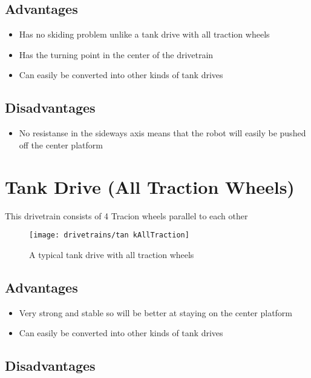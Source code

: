 \documentclass[../../main.tex]{subfiles}
\begin{document}
\subsection{Advantages} 

\begin{itemize} \item Has no skiding problem unlike a tank drive with all traction wheels \item Has the turning point in the center of the drivetrain \item Can easily be converted into other kinds of tank drives \end{itemize} 

\subsection{Disadvantages} 

\begin{itemize} \item No resistanse in the sideways axis means that the robot will easily be pushed off the center platform \end{itemize} 

\section{Tank Drive (All Traction Wheels)} 

This drivetrain consists of 4 Tracion wheels parallel to each other 

\begin{figure}[h] \centering 

	\texttt{[image: drivetrains/tan kAllTraction]} \caption{A typical tank drive with all traction wheels} \label{fig:drivetrainTankAllTraction} \end{figure} 

\subsection{Advantages} 

\begin{itemize} \item Very strong and stable so will be better at staying on the center platform \item Can easily be converted into other kinds of tank drives \end{itemize} 

\subsection{Disadvantages} 
\end{document}
